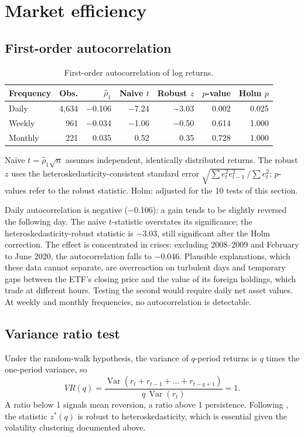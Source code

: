 \documentclass[11pt,a4paper]{article}
\newcommand{\keep}[1]{\Needspace{#1\baselineskip}}
\newcommand{\note}[1]{{\footnotesize\color{muted}#1\par}}
\begin{document}
\keep{24}
\section{Market efficiency}

\subsection{First-order autocorrelation}
\begin{table}[H]
\small
\caption{First-order autocorrelation of log returns.}
\begin{tabularx}{\linewidth}{L r r r r r r}
\toprule
\textbf{Frequency} & \textbf{Obs.} & \textbf{$\hat\rho_1$} & \textbf{Naive $t$} & \textbf{Robust $z$} & \textbf{$p$-value} & \textbf{Holm $p$} \\
\midrule
Daily & 4,634 & $-$0.106 & $-$7.24 & $-$3.03 & 0.002 & 0.025 \\
Weekly & 961 & $-$0.034 & $-$1.06 & $-$0.50 & 0.614 & 1.000 \\
Monthly & 221 & 0.035 & 0.52 & 0.35 & 0.728 & 1.000 \\
\bottomrule
\end{tabularx}
\end{table}
\note{Naive $t = \hat\rho_1\sqrt{n}$ assumes independent, identically distributed returns. The robust $z$ uses the heteroskedasticity-consistent standard error $\sqrt{\sum e_t^2 e_{t-1}^2}\,/\sum e_t^2$; $p$-values refer to the robust statistic. Holm: adjusted for the 10 tests of this section.}

Daily autocorrelation is negative ($-$0.106): a gain tends to be slightly reversed the following day. The naive $t$-statistic overstates its significance; the heteroskedasticity-robust statistic is $-$3.03, still significant after the Holm correction. The effect is concentrated in crises: excluding 2008--2009 and February to June 2020, the autocorrelation falls to $-$0.046. Plausible explanations, which these data cannot separate, are overreaction on turbulent days and temporary gaps between the ETF's closing price and the value of its foreign holdings, which trade at different hours. Testing the second would require daily net asset values. At weekly and monthly frequencies, no autocorrelation is detectable.

\keep{16}\subsection{Variance ratio test}
Under the random-walk hypothesis, the variance of $q$-period returns is $q$ times the one-period variance, so
\[
VR(q) = \frac{\operatorname{Var}\left(r_t + r_{t-1} + \dots + r_{t-q+1}\right)}{q \,\operatorname{Var}(r_t)} = 1 .
\]
A ratio below 1 signals mean reversion, a ratio above 1 persistence. Following \citet{lo1988}, the statistic $z^*(q)$ is robust to heteroskedasticity, which is essential given the volatility clustering documented above.
\end{document}
